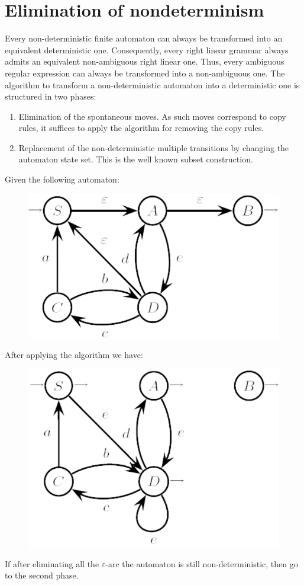 \section{Elimination of nondeterminism}

Every non-deterministic finite automaton can always be transformed into an equivalent deterministic one. 
Consequently, every right linear grammar always admits an equivalent non-ambiguous right linear one. 
Thus, every ambiguous regular expression can always be transformed into a non-ambiguous one. 
The algorithm to transform a non-deterministic automaton into a deterministic one is structured in two phases: 
\begin{enumerate}
    \item Elimination of the spontaneous moves. As such moves correspond to copy rules, it suffices to apply the algorithm for removing the copy rules. 
    \item Replacement of the non-deterministic multiple transitions by changing the automaton state set. This is the well known subset construction. 
\end{enumerate}
\begin{example}
    Given the following automaton: 
    \begin{figure}[H]
        \centering
        \includegraphics[width=0.25\linewidth]{images/oaut.png}
    \end{figure}
    After applying the algorithm we have: 
    \begin{figure}[H]
        \centering
        \includegraphics[width=0.25\linewidth]{images/faut.png}
    \end{figure}
    If after eliminating all the $\varepsilon$-arc the automaton is still non-deterministic, then go to the second phase.
\end{example}